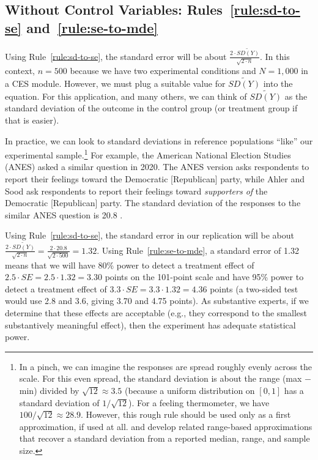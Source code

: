 \documentclass[12pt]{article}
\begin{document}
\subsection*{Without Control Variables: Rules~\ref{rule:sd-to-se} and~\ref{rule:se-to-mde}}

Using Rule~\ref{rule:sd-to-se}, the standard error will be about $\frac{2 \cdot \widetilde{SD(Y)}}{\sqrt{2 \cdot n}}$.
In this context, $n = 500$ because we have two experimental conditions and $N = 1{,}000$ in a CES module.
However, we must plug a suitable value for $\widetilde{SD(Y)}$ into the equation. For this application, and many others, we can think of $\widetilde{SD(Y)}$ as the standard deviation of the outcome in the control group (or treatment group if that is easier).

In practice, we can look to standard deviations in reference populations ``like'' our experimental sample.\footnote{In a pinch, we can imagine the responses are spread roughly evenly across the scale. For this even spread, the standard deviation is about the range (max $-$ min) divided by $\sqrt{12} \approx 3.5$ (because a uniform distribution on $[0, 1]$ has a standard deviation of $1/\sqrt{12}$). For a feeling thermometer, we have $100/\sqrt{12} \approx 28.9$. However, this rough rule should be used only as a first approximation, if used at all. \citet{Hozo2005} and \citet{Wan2014} develop related range-based approximations that recover a standard deviation from a reported median, range, and sample size.}
For example, the American National Election Studies (ANES) asked a similar question in 2020.
The ANES version asks respondents to report their feelings toward the Democratic [Republican] party, while Ahler and Sood ask respondents to report their feelings toward \emph{supporters of} the Democratic [Republican] party.
The standard deviation of the responses to the similar ANES question is 20.8 \citep{ANES2026}.

Using Rule~\ref{rule:sd-to-se}, the standard error in our replication will be about $\frac{2 \cdot \widetilde{SD(Y)}}{\sqrt{2 \cdot n}} = \frac{2 \cdot 20.8}{\sqrt{2 \cdot 500}} = 1.32$.
Using Rule~\ref{rule:se-to-mde}, a standard error of 1.32 means that we will have 80\% power to detect a treatment effect of $2.5 \cdot SE = 2.5 \cdot 1.32 = 3.30$ points on the 101-point scale and have 95\% power to detect a treatment effect of $3.3 \cdot SE = 3.3 \cdot 1.32 = 4.36$ points (a two-sided test would use 2.8 and 3.6, giving 3.70 and 4.75 points).
As substantive experts, if we determine that these effects are acceptable (e.g., they correspond to the smallest substantively meaningful effect), then the experiment has adequate statistical power.
\end{document}
